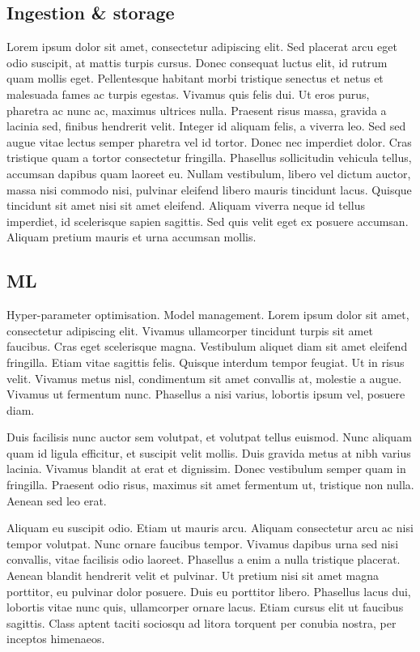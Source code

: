 \subsection{Ingestion \& storage}
Lorem ipsum dolor sit amet, consectetur adipiscing elit. Sed placerat arcu eget odio suscipit, at mattis turpis cursus. Donec consequat luctus elit, id rutrum quam mollis eget. Pellentesque habitant morbi tristique senectus et netus et malesuada fames ac turpis egestas. Vivamus quis felis dui. Ut eros purus, pharetra ac nunc ac, maximus ultrices nulla. Praesent risus massa, gravida a lacinia sed, finibus hendrerit velit. Integer id aliquam felis, a viverra leo. Sed sed augue vitae lectus semper pharetra vel id tortor. Donec nec imperdiet dolor. Cras tristique quam a tortor consectetur fringilla. Phasellus sollicitudin vehicula tellus, accumsan dapibus quam laoreet eu. Nullam vestibulum, libero vel dictum auctor, massa nisi commodo nisi, pulvinar eleifend libero mauris tincidunt lacus. Quisque tincidunt sit amet nisi sit amet eleifend. Aliquam viverra neque id tellus imperdiet, id scelerisque sapien sagittis. Sed quis velit eget ex posuere accumsan. Aliquam pretium mauris et urna accumsan mollis.

\subsection{ML} 
Hyper-parameter optimisation. Model management. Lorem ipsum dolor sit amet, consectetur adipiscing elit. Vivamus ullamcorper tincidunt turpis sit amet faucibus. Cras eget scelerisque magna. Vestibulum aliquet diam sit amet eleifend fringilla. Etiam vitae sagittis felis. Quisque interdum tempor feugiat. Ut in risus velit. Vivamus metus nisl, condimentum sit amet convallis at, molestie a augue. Vivamus ut fermentum nunc. Phasellus a nisi varius, lobortis ipsum vel, posuere diam.

Duis facilisis nunc auctor sem volutpat, et volutpat tellus euismod. Nunc aliquam quam id ligula efficitur, et suscipit velit mollis. Duis gravida metus at nibh varius lacinia. Vivamus blandit at erat et dignissim. Donec vestibulum semper quam in fringilla. Praesent odio risus, maximus sit amet fermentum ut, tristique non nulla. Aenean sed leo erat.

Aliquam eu suscipit odio. Etiam ut mauris arcu. Aliquam consectetur arcu ac nisi tempor volutpat. Nunc ornare faucibus tempor. Vivamus dapibus urna sed nisi convallis, vitae facilisis odio laoreet. Phasellus a enim a nulla tristique placerat. Aenean blandit hendrerit velit et pulvinar. Ut pretium nisi sit amet magna porttitor, eu pulvinar dolor posuere. Duis eu porttitor libero. Phasellus lacus dui, lobortis vitae nunc quis, ullamcorper ornare lacus. Etiam cursus elit ut faucibus sagittis. Class aptent taciti sociosqu ad litora torquent per conubia nostra, per inceptos himenaeos.


